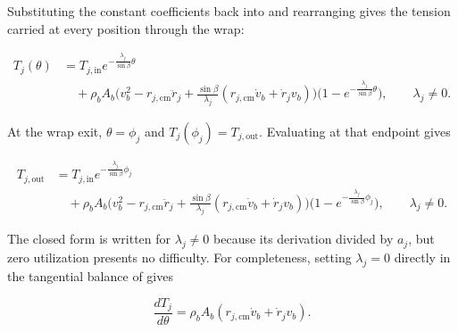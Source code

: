 \documentclass[11pt]{report}
\numberwithin{equation}{section}
\begin{document}
Substituting the constant coefficients back into
 and rearranging gives the tension
carried at every position through the wrap:

\begin{equation}
    \begin{aligned}
        T_j(\theta)
        &=
        T_{j,\mathrm{in}}
        e^{-\frac{\lambda_j}{\sin\beta}\theta}
        \\
        &\quad+
        \rho_bA_b
        \Big(
            v_b^2-r_{j,\mathrm{cm}}\ddot r_j
            +
            \frac{\sin\beta}{\lambda_j}
            \left(
                r_{j,\mathrm{cm}}\dot v_b
                +
                \dot r_jv_b
            \right)
        \Big)
        \Big(
            1-e^{-\frac{\lambda_j}{\sin\beta}\theta}
        \Big),
        \qquad \lambda_j\neq0.
    \end{aligned}
    \label{eq:wrap_tension_distribution}
\end{equation}

At the wrap exit, \(\theta=\phi_j\) and
\(T_j(\phi_j)=T_{j,\mathrm{out}}\). Evaluating
 at that endpoint gives

\begin{equation}
    \begin{aligned}
        T_{j,\mathrm{out}}
        &=
        T_{j,\mathrm{in}}
        e^{-\frac{\lambda_j}{\sin\beta}\phi_j}
        \\
        &\quad+
        \rho_bA_b
        \Big(
            v_b^2-r_{j,\mathrm{cm}}\ddot r_j
            +
            \frac{\sin\beta}{\lambda_j}
            \left(
                r_{j,\mathrm{cm}}\dot v_b
                +
                \dot r_jv_b
            \right)
        \Big)
        \Big(
            1-e^{-\frac{\lambda_j}{\sin\beta}\phi_j}
        \Big),
        \qquad \lambda_j\neq0.
    \end{aligned}
    \label{eq:wrap_entry_exit_tension}
\end{equation}

The closed form is written for \(\lambda_j\neq0\) because its derivation
divided by \(a_j\), but zero utilization presents no difficulty. For
completeness, setting \(\lambda_j=0\) directly in the tangential balance of
 gives

\begin{equation}
    \frac{dT_j}{d\theta}
    =
    \rho_bA_b
    \left(
        r_{j,\mathrm{cm}}\dot v_b+
        \dot r_jv_b
    \right).
    \label{eq:wrap_zero_traction_balance}
\end{equation}
\end{document}
